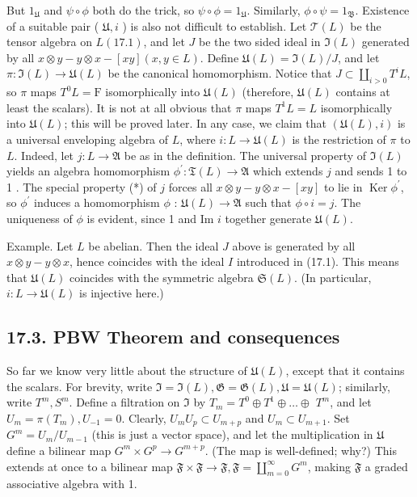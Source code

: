 \documentclass[10pt]{article}
\begin{document}
But $1_{\mathfrak{U}}$ and $\psi \circ \phi$ both do the trick, so $\psi \circ \phi=1_{\mathfrak{U}}$. Similarly, $\phi \circ \psi=1_{\mathfrak{B}}$. Existence of a suitable pair ( $\mathfrak{U}, i$ ) is also not difficult to establish. Let $\mathcal{T}(L)$ be the tensor algebra on $L(17.1)$, and let $J$ be the two sided ideal in $\mathfrak{I}(L)$ generated by all $x \otimes y-y \otimes x-[x y](x, y \in L)$. Define $\mathfrak{U}(L)=\mathfrak{I}(L) / J$, and let $\pi: \mathfrak{I}(L) \rightarrow \mathfrak{U}(L)$ be the canonical homomorphism. Notice that $J \subset \coprod_{i>0} T^{i} L$, so $\pi$ maps $T^{0} L=\mathrm{F}$ isomorphically into $\mathfrak{U}(L)$ (therefore, $\mathfrak{U}(L)$ contains at least the scalars). It is not at all obvious that $\pi$ maps $T^{1} L=L$ isomorphically into $\mathfrak{U}(L)$; this will be proved later. In any case, we claim that $(\mathfrak{U}(L), i)$ is a universal enveloping algebra of $L$, where $i: L \rightarrow \mathfrak{U}(L)$ is the restriction of $\pi$ to $L$. Indeed, let $j: L \rightarrow \mathfrak{A}$ be as in the definition. The universal property of $\mathfrak{I}(L)$ yields an algebra homomorphism $\phi^{\prime}: \mathfrak{T}(L) \rightarrow \mathfrak{A}$ which extends $j$ and sends 1 to 1 . The special property (*) of $j$ forces all $x \otimes y-y \otimes x-[x y]$ to lie in $\operatorname{Ker} \phi^{\prime}$, so $\phi^{\prime}$ induces a homomorphism $\phi$ : $\mathfrak{U}(L) \rightarrow \mathfrak{A}$ such that $\phi \circ i=j$. The uniqueness of $\phi$ is evident, since 1 and Im $i$ together generate $\mathfrak{U}(L)$.

Example. Let $L$ be abelian. Then the ideal $J$ above is generated by all $x \otimes y-y \otimes x$, hence coincides with the ideal $I$ introduced in (17.1). This means that $\mathfrak{U}(L)$ coincides with the symmetric algebra $\mathfrak{S}(L)$. (In particular, $i: L \rightarrow \mathfrak{U}(L)$ is injective here.)

\subsection*{17.3. PBW Theorem and consequences}
So far we know very little about the structure of $\mathfrak{U}(L)$, except that it contains the scalars. For brevity, write $\mathfrak{I}=\mathfrak{I}(L), \mathfrak{G}=\mathfrak{G}(L), \mathfrak{U}=\mathfrak{U}(L)$; similarly, write $T^{m}, S^{m}$. Define a filtration on $\mathfrak{I}$ by $T_{m}=T^{0} \oplus T^{1} \oplus \ldots \oplus$ $T^{m}$, and let $U_{m}=\pi\left(T_{m}\right), U_{-1}=0$. Clearly, $U_{m} U_{p} \subset U_{m+p}$ and $U_{m} \subset U_{m+1}$. Set $G^{m}=U_{m} / U_{m-1}$ (this is just a vector space), and let the multiplication in $\mathfrak{U}$ define a bilinear map $G^{m} \times G^{p} \rightarrow G^{m+p}$. (The map is well-defined; why?) This extends at once to a bilinear map $\mathfrak{F} \times \mathfrak{F} \rightarrow \mathfrak{F}, \mathfrak{F}=\coprod_{m=0}^{\infty} G^{m}$, making $\mathfrak{F}$ a graded associative algebra with 1.
\end{document}
